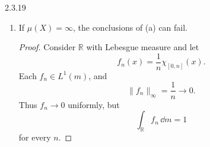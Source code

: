\documentclass[11pt]{article}
\begin{document}
\begin{problem}{2.3.19}
\begin{enumerate}[label=(\alph*)]
    \item If \( \mu(X)=\infty \), the conclusions of (a) can fail.
          \begin{proof}
            Consider \( \mathbb{R} \) with Lebesgue measure and let
            \begin{equation}
              \label{eq:p1-example1}
              f_n(x)=\frac{1}{n}\chi_{[0,n]}(x).
            \end{equation}
            Each \( f_n\in L^1(m) \), and
            \begin{equation}
              \label{eq:p1-example1-uniform}
              \|f_n\|_\infty=\frac{1}{n}\to 0.
            \end{equation}
            Thus \( f_n\to 0 \) uniformly, but
            \begin{equation}
              \label{eq:p1-example1-integral}
              \int_{\mathbb{R}}f_n\,\dd{m}=1
            \end{equation}
            for every \( n \).
          \end{proof}
  \end{enumerate}
\end{problem}
\end{document}
